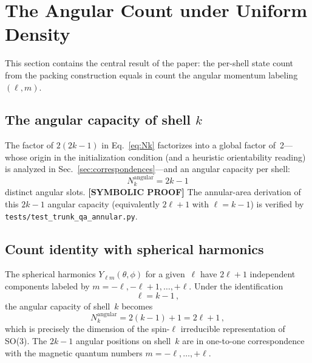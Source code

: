 \documentclass[aps,prl,reprint,amsmath,amssymb]{revtex4-2}
\begin{document}
\section{The Angular Count under Uniform Density}
\label{sec:angular}

This section contains the central result of the paper: the per-shell
state count from the packing construction equals in count the angular
momentum labeling $(\ell, m)$.

\subsection{The angular capacity of shell $k$}

The factor of $2(2k-1)$ in Eq.~\eqref{eq:Nk} factorizes into a
global factor of~2---whose origin in the initialization condition (and
a heuristic orientability reading) is analyzed in
Sec.~\ref{sec:correspondences}---and an angular capacity per shell:
\begin{equation}
  N_k^{\mathrm{angular}} = 2k - 1
  \label{eq:angular-capacity}
\end{equation}
distinct angular slots.  \textbf{[SYMBOLIC PROOF]} The annular-area derivation of this $2k-1$
angular capacity (equivalently $2\ell+1$ with $\ell = k-1$) is verified
by \texttt{tests/test\_trunk\_qa\_annular.py}.

\subsection{Count identity with spherical harmonics}

The spherical harmonics $Y_{\ell m}(\theta, \phi)$ for a given~$\ell$
have $2\ell + 1$ independent components labeled by
$m = -\ell, -\ell+1, \ldots, +\ell$.  Under the identification
\begin{equation}
  \ell = k - 1 \,,
  \label{eq:ell-k}
\end{equation}
the angular capacity of shell~$k$ becomes
\begin{equation}
  N_k^{\mathrm{angular}} = 2(k-1) + 1 = 2\ell + 1 \,,
  \label{eq:2ell-plus-1}
\end{equation}
which is precisely the dimension of the spin-$\ell$ irreducible
representation of SO(3).  The $2k-1$ angular positions on shell~$k$
are in one-to-one correspondence with the magnetic quantum numbers
$m = -\ell, \ldots, +\ell$.
\end{document}
